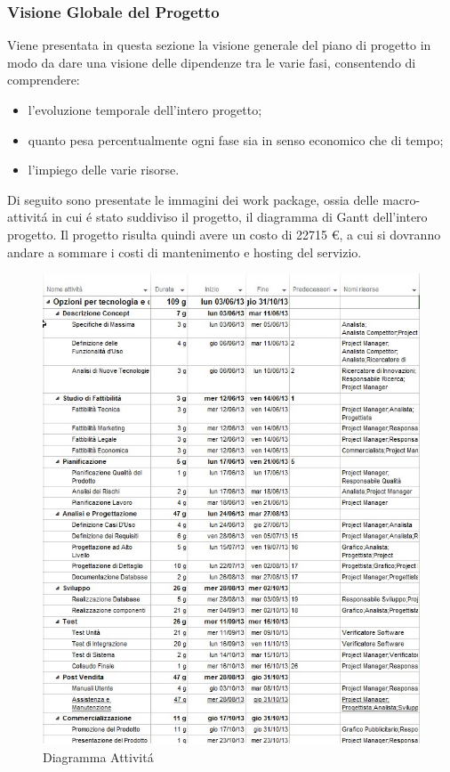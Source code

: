 \subsubsection{Visione Globale del Progetto}
Viene presentata in questa sezione la visione generale del piano di progetto in modo da
dare una visione delle dipendenze tra le varie fasi, consentendo di comprendere:
\begin{itemize}
\item l'evoluzione temporale dell'intero progetto;
\item quanto pesa percentualmente ogni fase sia in senso economico che di tempo;
\item l'impiego delle varie risorse.
\end{itemize}
Di seguito sono presentate le immagini dei work package, ossia delle macro-attivit\'a in cui
\'e stato suddiviso il progetto, il diagramma di Gantt dell'intero progetto.
Il progetto risulta quindi avere un costo di 22715 \euro{}, a cui si dovranno andare a
sommare i costi di mantenimento e hosting del servizio.

\begin{figure}[H]
\begin{center}
\includegraphics[width=1\textwidth]{img/Attivitanuovo.jpg}
\caption{Diagramma  Attivit\'a}
\label{fig:Diagramma Attivit\'a}
\end{center}
\end{figure}

